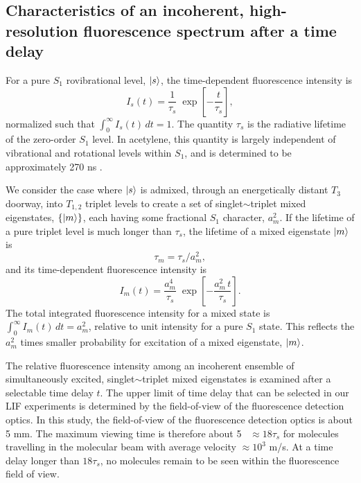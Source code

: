\subsection{Characteristics of an incoherent, high-resolution
  fluorescence spectrum after a time delay}

For a pure $S_1$ rovibrational level, $\mathinner{|{s}\rangle}$, the time-dependent
fluorescence intensity is
\begin{equation}
  I_s(t) = \frac{1}{\tau_s} \;
           \exp \left[
             -\frac{t}{ \tau_s} 
           \right],
\end{equation}
normalized such that $\int_0^{\infty} I_s(t) \, dt = 1$.  The quantity
$\tau_s$ is the radiative lifetime of the zero-order $S_1$ level.  In
acetylene, this quantity is largely independent of vibrational and
rotational levels within $S_1$, and is determined to be approximately
270 ns \cite{ochi91, stephenson84}.

We consider the case where $\mathinner{|{s}\rangle}$ is admixed, through an
energetically distant $T_3$ doorway, into $T_{1,2}$ triplet levels to
create a set of singlet$\sim$triplet mixed eigenstates, $\lbrace
\mathinner{|{m}\rangle} \rbrace$, each having some fractional $S_1$ character,
$a_m^2$.  If the lifetime of a pure triplet level is much longer than
$\tau_s$, the lifetime of a mixed eigenstate $\mathinner{|{m}\rangle}$ is
\begin{equation}
  \label{eq:tau-m}
  \tau_m = \tau_s / a_m^2,
\end{equation}
and its time-dependent fluorescence intensity is
\begin{equation}
  \label{eq:int-m}
  I_m(t) = \frac{a_m^4}{\tau_s} \;
           \exp \left[
             -\frac{a_m^2 \, t}{\tau_s} 
           \right].
\end{equation}
The total integrated fluorescence intensity for a mixed state is
$\int_0^{\infty} I_m(t) \, dt = a_m^2$, relative to unit intensity for
a pure $S_1$ state.  This reflects the $a_m^2$ times smaller
probability for excitation of a mixed eigenstate, $\mathinner{|{m}\rangle}$.

The relative fluorescence intensity among an incoherent ensemble of
simultaneously excited, singlet$\sim$triplet mixed eigenstates is
examined after a selectable time delay $t$.  The upper limit of time
delay that can be selected in our LIF experiments is determined by the
field-of-view of the fluorescence detection optics.  In this study,
the field-of-view of the fluorescence detection optics is about 5 mm.
The maximum viewing time is therefore about 5 \microsec\ $\approx
18\tau_s$ for molecules travelling in the molecular beam with average
velocity $\approx 10^3$ m/s.  At a time delay longer than $18\tau_s$,
no molecules remain to be seen within the fluorescence field of view.

